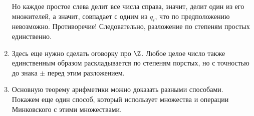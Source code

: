 \begin{enumerate}
Но каждое простое слева делит все числа справа, значит, делит один из его множителей, а значит, совпадает с одним из $q_i$, что по предположению невозможно. Противоречие! Следовательно, разложение по степеням простых единственно.
\item Здесь еще нужно сделать оговорку про $\Z$. Любое целое число также единственным образом раскладывается по степеням порстых, но с точностью до знака $\pm$ перед этим разложением.



\item Основную теорему арифметики можно доказать разными способами. Покажем еще один способ, который использует множества и операции Минковского с этими множествами.
\end{enumerate}


